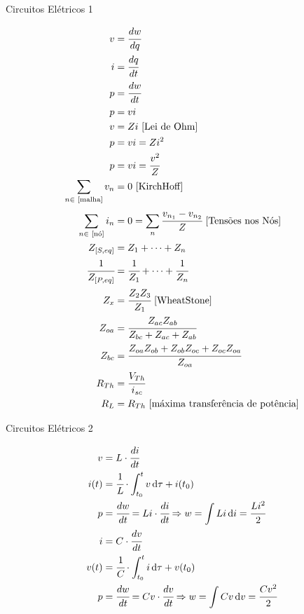 \documentclass[12pt,a4paper]{article}
\begin{document}
\Large

Circuitos El\'etricos 1

\normalsize

\begin{align}
v &= \cfrac{dw}{dq} \\
i &= \cfrac{dq}{dt} \\
p &= \cfrac{dw}{dt} \\
p &= vi \\
v &= Zi \text{ [Lei de Ohm]} \\
p &= vi = Zi^2 \\
p &= vi = \cfrac{v^2}{Z} \\
\sum_{n \in \text{ [malha]}} v_n &= 0 \text{ [KirchHoff]} \\
\sum_{n \in \text{ [n\'o]}} i_n &= 0 = \sum_{n} \cfrac{v_{n_1} - v_{n_2}}{Z} \text{ [Tens\~oes nos N\'os]} \\
Z_{[S,eq]} &= Z_1 + \cdots + Z_n \\
\cfrac{1}{Z_{[P,eq]}} &= \cfrac{1}{Z_1} + \cdots + \cfrac{1}{Z_n} \\
Z_x &= \cfrac{Z_2 Z_3}{Z_1} \text{ [WheatStone]} \\
Z_{oa} &= \cfrac{Z_{ac} Z_{ab}}{Z_{bc} + Z_{ac} + Z_{ab}} \\
Z_{bc} &= \cfrac{Z_{oa} Z_{ob} + Z_{ob} Z_{oc} + Z_{oc} Z_{oa}}{Z_{oa}} \\
R_{Th} &= \cfrac{V_{Th}}{i_{sc}} \\
R_L &= R_{Th} \text{ [m\'axima transfer\^encia de pot\^encia]}
\end{align}

\Large

Circuitos El\'etricos 2

\normalsize

\begin{align}
v &= L \cdot \cfrac{di}{dt} \\
i(t) &= \cfrac{1}{L}\cdot \int_{t_0}^t v \,\mathrm{d}\tau + i(t_0) \\
p &= \cfrac{dw}{dt} = Li \cdot \cfrac{di}{dt} \Rightarrow w = \int Li\,\mathrm{d}i = \cfrac{Li^2}{2} \\
i &= C \cdot \cfrac{dv}{dt} \\
v(t) &= \cfrac{1}{C}\cdot \int_{t_0}^t i \,\mathrm{d}\tau + v(t_0) \\
p &= \cfrac{dw}{dt} = Cv \cdot \cfrac{dv}{dt} \Rightarrow w = \int Cv\,\mathrm{d}v = \cfrac{Cv^2}{2}
\end{align}
\end{document}
